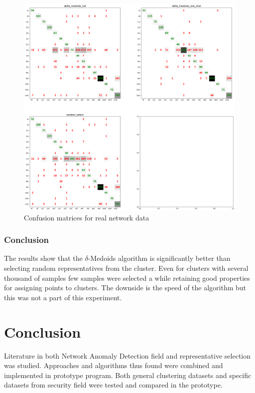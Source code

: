 \documentclass[thesis=B,english]{FITthesis}[2012/10/20]
\begin{document}
\begin{figure}[H]
   \includegraphics[width=\linewidth]{img/exp4.png}
  \caption{Confusion matrices for real network data}
  \label{img:exp4}
\end{figure}

\subsection{Conclusion}
The results show that the $\delta$-Medoids algorithm is significantly better than selecting random representatives from the cluster.
Even for clusters with several thousand of samples few samples were selected a while retaining good properties for assigning points to clusters.
The downside is the speed of the algorithm but this was not a part of this experiment.



\chapter{Conclusion}
Literature in both Network Anomaly Detection field and representative selection was studied.
Approaches and algorithms thus found were combined and implemented in prototype program.
Both general clustering datasets and specific datasets from security field were tested and compared in the prototype.
\end{document}
